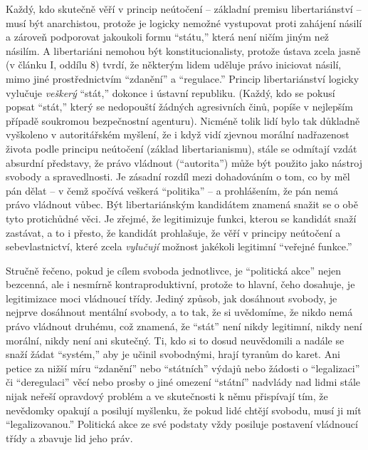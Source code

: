 \documentclass{book}
\begin{document}
Každý, kdo skutečně věří v princip neútočení -- základní premisu libertariánství -- musí být anarchistou, protože je logicky nemožné vystupovat proti zahájení násilí a zároveň podporovat jakoukoli formu \enquote{státu,} která není ničím jiným než násilím. A libertariáni nemohou být konstitucionalisty, protože ústava zcela jasně (v článku I, oddílu 8) tvrdí, že některým lidem uděluje právo iniciovat násilí, mimo jiné prostřednictvím \enquote{zdanění} a \enquote{regulace.} Princip libertariánství logicky vylučuje \emph{veškerý} \enquote{stát,} dokonce i ústavní republiku. (Každý, kdo se pokusí popsat \enquote{stát,} který se nedopouští žádných agresivních činů, popíše v nejlepším případě soukromou bezpečnostní agenturu). Nicméně tolik lidí bylo tak důkladně vyškoleno v autoritářském myšlení, že i když vidí zjevnou morální nadřazenost života podle principu neútočení (základ libertarianismu), stále se odmítají vzdát absurdní představy, že právo vládnout (\enquote{autorita}) může být použito jako nástroj svobody a spravedlnosti. Je zásadní rozdíl mezi dohadováním o tom, co by měl pán dělat -- v čemž spočívá veškerá \enquote{politika} -- a prohlášením, že pán nemá právo vládnout vůbec. Být libertariánským kandidátem znamená snažit se o obě tyto protichůdné věci. Je zřejmé, že legitimizuje funkci, kterou se kandidát snaží zastávat, a to i přesto, že kandidát prohlašuje, že věří v principy neútočení a sebevlastnictví, které zcela \emph{vylučují} možnost jakékoli legitimní \enquote{veřejné funkce.}

Stručně řečeno, pokud je cílem svoboda jednotlivce, je \enquote{politická akce} nejen bezcenná, ale i nesmírně kontraproduktivní, protože to hlavní, čeho dosahuje, je legitimizace moci vládnoucí třídy. Jediný způsob, jak dosáhnout svobody, je nejprve dosáhnout mentální svobody, a to tak, že si uvědomíme, že nikdo nemá právo vládnout druhému, což znamená, že \enquote{stát} není nikdy legitimní, nikdy není morální, nikdy není ani skutečný. Ti, kdo si to dosud neuvědomili a nadále se snaží žádat \enquote{systém,} aby je učinil svobodnými, hrají tyranům do karet. Ani petice za nižší míru \enquote{zdanění} nebo \enquote{státních} výdajů nebo žádosti o \enquote{legalizaci} či \enquote{deregulaci} věcí nebo prosby o jiné omezení \enquote{státní} nadvlády nad lidmi stále nijak neřeší opravdový problém a ve skutečnosti k němu přispívají tím, že nevědomky opakují a posilují myšlenku, že pokud lidé chtějí svobodu, musí ji mít \enquote{legalizovanou.} Politická akce ze své podstaty vždy posiluje postavení vládnoucí třídy a zbavuje lid jeho práv.
\end{document}
